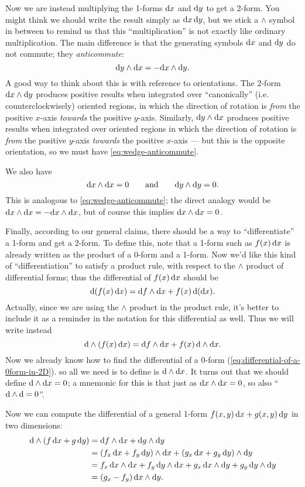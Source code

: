 \documentclass[12pt]{amsart}
\begin{document}
Now we are instead multiplying the 1-forms ${\mathrm{d} x}$ and ${\mathrm{d} y}$ to get a 2-form.
You might think we should write the result simply as ${\mathrm{d} x}\,{\mathrm{d} y}$, but we stick a $\wedge$ symbol in between to remind us that this ``multiplication'' is not exactly like ordinary multiplication.
The main difference is that the generating symbols ${\mathrm{d} x}$ and ${\mathrm{d} y}$ do not commute; they \emph{anticommute}:
\begin{equation}
  {\ensuremath{\mathrm{d} y}}\wedge{\ensuremath{\mathrm{d} x}} = - {\mathrm{d} x}\wedge {\ensuremath{\mathrm{d} y}}.\label{eq:wedge-anticommute}
\end{equation}
A good way to think about this is with reference to orientations.
The 2-form ${\mathrm{d} x}\wedge{\ensuremath{\mathrm{d} y}}$ produces positive results when integrated over ``canonically'' (i.e. counterclockwisely) oriented regions, in which the direction of rotation is \emph{from} the positive $x$-axis \emph{towards} the positive $y$-axis.
Similarly, ${\mathrm{d} y}\wedge{\ensuremath{\mathrm{d} x}}$ produces positive results when integrated over oriented regions in which the direction of rotation is \emph{from} the positive $y$-axis \emph{towards} the positive $x$-axis --- but this is the opposite orientation, so we must have \cref{eq:wedge-anticommute}.

We also have
\[ {\mathrm{d} x} \wedge {\ensuremath{\mathrm{d} x}} = 0 \qquad\text{and}\qquad {\ensuremath{\mathrm{d} y}}\wedge {\ensuremath{\mathrm{d} y}} = 0. \]
This is analogous to \cref{eq:wedge-anticommute}; the direct analogy would be ${\mathrm{d} x}\wedge{\ensuremath{\mathrm{d} x}} = - {\mathrm{d} x}\wedge{\ensuremath{\mathrm{d} x}}$, but of course this implies ${\mathrm{d} x}\wedge{\ensuremath{\mathrm{d} x}}=0$.

Finally, according to our general claims, there should be a way to ``differentiate'' a 1-form and get a 2-form.
To define this, note that a 1-form such as $f(x)\,{\mathrm{d} x}$ is already written as the product of a 0-form and a 1-form.
Now we'd like this kind of ``differentiation'' to satisfy a product rule, with respect to the $\wedge$ product of differential forms; thus the differential of $f(x)\,{\mathrm{d} x}$ should be
\[ \mathrm{d}(f(x)\,{\mathrm{d} x}) =  {\mathrm{d} f} \wedge{\ensuremath{\mathrm{d} x}} + f(x)\, \mathrm{d}({\mathrm{d} x}). \]
Actually, since we are using the $\wedge$ product in the product rule, it's better to include it as a reminder in the notation for this differential as well.
Thus we will write instead
\[ \mathrm{d}\wedge(f(x)\,{\mathrm{d} x}) =  {\mathrm{d} f} \wedge{\ensuremath{\mathrm{d} x}} + f(x)\, \mathrm{d}\wedge{\ensuremath{\mathrm{d} x}}. \]
Now we already know how to find the differential of a 0-form (\cref{eq:differential-of-a-0form-in-2D}). so all we need is to define is $\mathrm{d}\wedge{\ensuremath{\mathrm{d} x}}$.
It turns out that we should define $\mathrm{d}\wedge{\ensuremath{\mathrm{d} x}}=0$; a mnemonic for this is that just as ${\mathrm{d} x}\wedge {\ensuremath{\mathrm{d} x}} = 0$, so also ``$\mathrm{d}\wedge\mathrm{d} = 0$''.

Now we can compute the differential of a general 1-form $f(x,y)\,{\mathrm{d} x} + g(x,y)\,{\mathrm{d} y}$ in two dimensions:
\begin{align*}
  \mathrm{d}\wedge(f\,{\mathrm{d} x} + g\,{\mathrm{d} y})
  &= {\mathrm{d} f} \wedge {\ensuremath{\mathrm{d} x}} + {\mathrm{d} g} \wedge{\ensuremath{\mathrm{d} y}}\\
  &= (f_x\, {\mathrm{d} x} + f_y\, {\mathrm{d} y}) \wedge {\ensuremath{\mathrm{d} x}} + (g_x \,{\mathrm{d} x}+g_y\,{\mathrm{d} y})\wedge{\ensuremath{\mathrm{d} y}} \\
  &= f_x\, {\mathrm{d} x}\wedge{\ensuremath{\mathrm{d} x}} + f_y\, {\mathrm{d} y}\wedge {\ensuremath{\mathrm{d} x}} + g_x \,{\mathrm{d} x} \wedge{\ensuremath{\mathrm{d} y}} + g_y\,{\mathrm{d} y}\wedge{\ensuremath{\mathrm{d} y}} \\
  &= (g_x - f_y)\, {\mathrm{d} x}\wedge{\ensuremath{\mathrm{d} y}}.
\end{align*}
\end{document}
